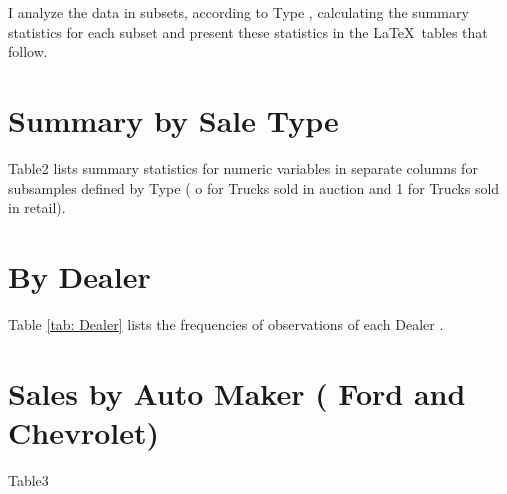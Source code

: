 \documentclass[11pt]{article}
\begin{document}
\medskip
\noindent
I analyze the data in subsets, according to Type , 
calculating the summary statistics for each subset and present these 
statistics in the \LaTeX\ tables that follow.

\vfill


\pagebreak
\section{Summary by Sale Type}

Table2 lists summary statistics for numeric variables
in separate columns for subsamples defined by Type ( o for Trucks sold in auction and 1 for Trucks sold in retail). 





\section{By Dealer}

Table \ref{tab: Dealer} lists the frequencies of observations of 
each Dealer . 



\pagebreak
\section{Sales by Auto Maker ( Ford and Chevrolet)}

Table3





\end{document}
